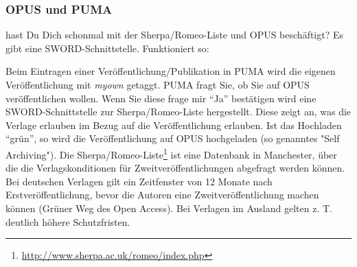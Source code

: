 \subsubsection{OPUS und PUMA}
hast Du Dich schonmal mit der Sherpa/Romeo-Liste und OPUS beschäftigt?
Es gibt eine SWORD-Schnittstelle. Funktioniert so:

Beim Eintragen einer Veröffentlichung/Publikation in PUMA wird die eigenen Veröffentlichung mit \textit{myown} getaggt. PUMA fragt Sie, ob Sie 
auf OPUS veröffentlichen wollen. Wenn Sie diese frage mir \enquote{Ja} bestätigen wird eine SWORD-Schnittstelle zur
Sherpa/Romeo-Liste hergestellt. Diese zeigt an, was die Verlage erlauben im Bezug auf die Veröffentlichung erlauben. Ist das Hochladen \enquote{grün}, so wird die Veröffentlichung auf OPUS  hochgeladen (so genanntes "Self Archiving").
\newline \newline
Die Sherpa/Romeo-Liste\footnote{\url{http://www.sherpa.ac.uk/romeo/index.php}} ist eine Datenbank in Manchester, über die die Verlagskonditionen für Zweitveröffentlichungen abgefragt werden können. Bei deutschen Verlagen gilt ein Zeitfenster von 12 Monate nach Erstveröffentlichung, bevor die Autoren eine Zweitveröffentlichung machen können (Grüner Weg des Open Access). Bei Verlagen im Ausland gelten z. T. deutlich höhere Schutzfristen.

